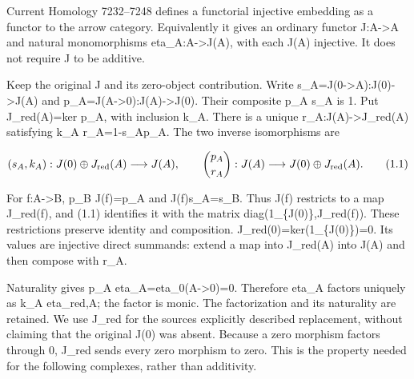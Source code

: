 \documentclass[11pt]{article}
\begin{document}
Current Homology 7232–\allowbreak{}7248 defines a functorial injective embedding as a functor to the arrow category. Equivalently it gives an ordinary functor J:\allowbreak{}A\allowbreak{}->A and natural monomorphisms eta\_\allowbreak{}A:\allowbreak{}A\allowbreak{}->J(A)\allowbreak{},\allowbreak{} with each J(A)\allowbreak{} injective. It does not require J to be additive.

Keep the original J and its zero-object contribution. Write s\_\allowbreak{}A\allowbreak{}=J(0\allowbreak{}->A)\allowbreak{}:\allowbreak{}J(0)\allowbreak{}\allowbreak{}->J(A)\allowbreak{} and p\_\allowbreak{}A\allowbreak{}=J(A\allowbreak{}->0)\allowbreak{}:\allowbreak{}J(A)\allowbreak{}\allowbreak{}->J(0)\allowbreak{}. Their composite p\_\allowbreak{}A s\_\allowbreak{}A is 1. Put J\_\allowbreak{}red(A)\allowbreak{}\allowbreak{}=ker p\_\allowbreak{}A,\allowbreak{} with inclusion k\_\allowbreak{}A. There is a unique r\_\allowbreak{}A:\allowbreak{}J(A)\allowbreak{}\allowbreak{}->J\_\allowbreak{}red(A)\allowbreak{} satisfying k\_\allowbreak{}A r\_\allowbreak{}A\allowbreak{}=1-s\_\allowbreak{}Ap\_\allowbreak{}A. The two inverse isomorphisms are

\[
 (s_A,k_A):J(0)\oplus J_{\rm red}(A)\longrightarrow J(A),
 \qquad
 \binom{p_A}{r_A}:J(A)\longrightarrow J(0)\oplus J_{\rm red}(A).
                                                               \tag{1.1}
\]

For f:\allowbreak{}A\allowbreak{}->B,\allowbreak{} p\_\allowbreak{}B J(f)\allowbreak{}\allowbreak{}=p\_\allowbreak{}A and J(f)\allowbreak{}s\_\allowbreak{}A\allowbreak{}=s\_\allowbreak{}B. Thus J(f)\allowbreak{} restricts to a map J\_\allowbreak{}red(f)\allowbreak{},\allowbreak{} and (1.1)\allowbreak{} identifies it with the matrix diag(1\_\allowbreak{}\{J(0)\allowbreak{}\},\allowbreak{}J\_\allowbreak{}red(f)\allowbreak{})\allowbreak{}. These restrictions preserve identity and composition. J\_\allowbreak{}red(0)\allowbreak{}\allowbreak{}=ker(1\_\allowbreak{}\{J(0)\allowbreak{}\})\allowbreak{}\allowbreak{}=0. Its values are injective direct summands:\allowbreak{} extend a map into J\_\allowbreak{}red(A)\allowbreak{} into J(A)\allowbreak{} and then compose with r\_\allowbreak{}A.

Naturality gives p\_\allowbreak{}A eta\_\allowbreak{}A\allowbreak{}=eta\_\allowbreak{}0(A\allowbreak{}->0)\allowbreak{}\allowbreak{}=0. Therefore eta\_\allowbreak{}A factors uniquely as k\_\allowbreak{}A eta\_\allowbreak{}red,\allowbreak{}A; the factor is monic. The factorization and its naturality are retained. We use J\_\allowbreak{}red for the source\textquotesingle s explicitly described replacement,\allowbreak{} without claiming that the original J(0)\allowbreak{} was absent. Because a zero morphism factors through 0,\allowbreak{} J\_\allowbreak{}red sends every zero morphism to zero. This is the property needed for the following complexes,\allowbreak{} rather than additivity.
\end{document}
